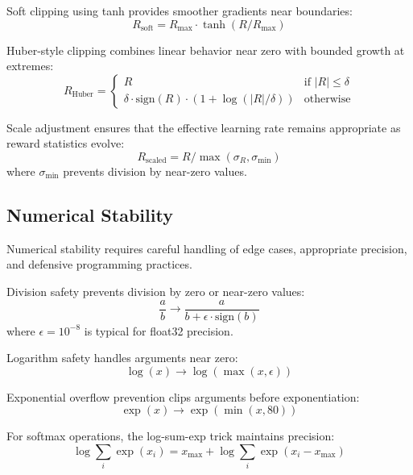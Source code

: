 Soft clipping using tanh provides smoother gradients near boundaries:
\begin{equation}
R_{\text{soft}} = R_{\text{max}} \cdot \tanh(R / R_{\text{max}})
\label{eq:soft_clipping}
\end{equation}

Huber-style clipping combines linear behavior near zero with bounded growth at extremes:
\begin{equation}
R_{\text{Huber}} = \begin{cases}
R & \text{if } |R| \leq \delta \\
\delta \cdot \text{sign}(R) \cdot (1 + \log(|R|/\delta)) & \text{otherwise}
\end{cases}
\label{eq:huber_clipping}
\end{equation}

Scale adjustment ensures that the effective learning rate remains appropriate as reward statistics evolve:
\begin{equation}
R_{\text{scaled}} = R / \max(\sigma_R, \sigma_{\text{min}})
\label{eq:scale_adjustment}
\end{equation}
where $\sigma_{\text{min}}$ prevents division by near-zero values.

\subsection{Numerical Stability}

Numerical stability requires careful handling of edge cases, appropriate precision, and defensive programming practices.

Division safety prevents division by zero or near-zero values:
\begin{equation}
\frac{a}{b} \to \frac{a}{b + \epsilon \cdot \text{sign}(b)}
\label{eq:safe_division}
\end{equation}
where $\epsilon = 10^{-8}$ is typical for float32 precision.

Logarithm safety handles arguments near zero:
\begin{equation}
\log(x) \to \log(\max(x, \epsilon))
\label{eq:safe_log}
\end{equation}

Exponential overflow prevention clips arguments before exponentiation:
\begin{equation}
\exp(x) \to \exp(\min(x, 80))
\label{eq:safe_exp}
\end{equation}

For softmax operations, the log-sum-exp trick maintains precision:
\begin{equation}
\log \sum_i \exp(x_i) = x_{\max} + \log \sum_i \exp(x_i - x_{\max})
\label{eq:logsumexp}
\end{equation}

